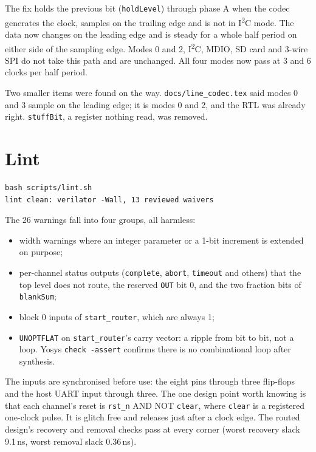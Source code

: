 \documentclass[11pt,a4paper]{article}
\newcommand{\sig}[1]{\texttt{#1}}
\begin{document}
The fix holds the previous bit (\sig{holdLevel}) through phase A when the codec generates the clock, samples on the trailing edge and is not in I\textsuperscript{2}C mode. The data now changes on the leading edge and is steady for a whole half period on either side of the sampling edge. Modes 0 and 2, I\textsuperscript{2}C, MDIO, SD card and 3-wire SPI do not take this path and are unchanged. All four modes now pass at 3 and 6 clocks per half period.

Two smaller items were found on the way. \sig{docs/line\_codec.tex} said modes 0 and 3 sample on the leading edge; it is modes 0 and 2, and the RTL was already right. \sig{stuffBit}, a register nothing read, was removed.

\section{Lint}

\begin{lstlisting}
bash scripts/lint.sh
lint clean: verilator -Wall, 13 reviewed waivers
\end{lstlisting}

The 26 warnings fall into four groups, all harmless:
\begin{itemize}
\item width warnings where an integer parameter or a 1-bit increment is extended on purpose;
\item per-channel status outputs (\sig{complete}, \sig{abort}, \sig{timeout} and others) that the top level does not route, the reserved \sig{OUT} bit 0, and the two fraction bits of \sig{blankSum};
\item block 0 inputs of \sig{start\_router}, which are always 1;
\item \sig{UNOPTFLAT} on \sig{start\_router}'s carry vector: a ripple from bit to bit, not a loop. Yosys \sig{check -assert} confirms there is no combinational loop after synthesis.
\end{itemize}

The inputs are synchronised before use: the eight pins through three flip-flops and the host UART input through three. The one design point worth knowing is that each channel's reset is \sig{rst\_n} AND NOT \sig{clear}, where \sig{clear} is a registered one-clock pulse. It is glitch free and releases just after a clock edge. The routed design's recovery and removal checks pass at every corner (worst recovery slack 9.1\,ns, worst removal slack 0.36\,ns).
\end{document}
